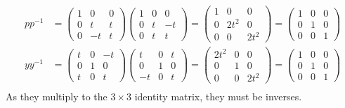 \documentclass{article}
\begin{document}
\begin{equation}
    \begin{split}
        pp^{-1} & = \begin{pmatrix} 
            1 & 0 & 0 \\
            0 & t & t  \\
            0 & -t & t
        \end{pmatrix}\begin{pmatrix} 
            1 & 0 & 0 \\
            0 & t & -t  \\
            0 & t & t
        \end{pmatrix} = \begin{pmatrix} 
            1 & 0 & 0 \\
            0 & 2t^2 & 0  \\
            0 & 0 & 2t^2
        \end{pmatrix} = \begin{pmatrix} 
            1 & 0 & 0 \\
            0 & 1 & 0  \\
            0 & 0 & 1
        \end{pmatrix} \\
        yy^{-1} & = \begin{pmatrix} 
            t & 0 & -t \\
            0 & 1 &  0 \\
            t & 0 & t
        \end{pmatrix}\begin{pmatrix} 
            t & 0 & t \\
            0 & 1 &  0 \\
            -t & 0 & t
        \end{pmatrix} = \begin{pmatrix} 
            2t^2 & 0 & 0 \\
            0 & 1 & 0  \\
            0 & 0 & 2t^2
        \end{pmatrix} = \begin{pmatrix} 
            1 & 0 & 0 \\
            0 & 1 & 0  \\
            0 & 0 & 1
        \end{pmatrix} \\
    \end{split}
\end{equation}
As they multiply to the $3 \times 3$ identity matrix, they must be inverses.
\end{document}
